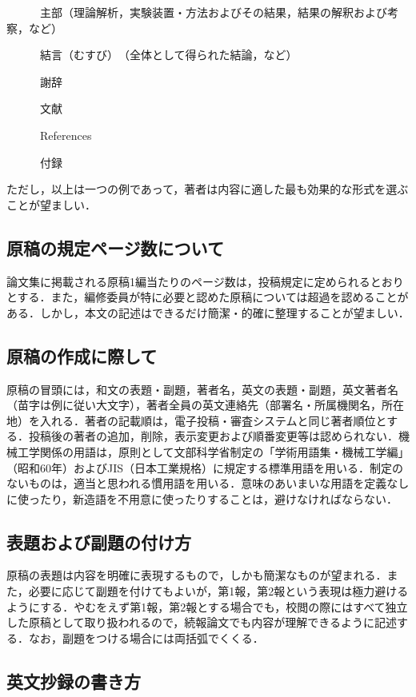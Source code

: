 \documentclass[a4jsme, fleqn]{jsmepaper}
\begin{document}
　　　主部（理論解析，実験装置・方法およびその結果，結果の解釈および考察，など）

　　　結言（むすび）　（全体として得られた結論，など）

　　　謝辞

　　　文献

　　　References

　　　付録

ただし，以上は一つの例であって，著者は内容に適した最も効果的な形式を選ぶことが望ましい．

\subsection{原稿の規定ページ数について}

論文集に掲載される原稿1編当たりのページ数は，投稿規定に定められるとおりとする．また，編修委員が特に必要と認めた原稿については超過を認めることがある．しかし，本文の記述はできるだけ簡潔・的確に整理することが望ましい．

\subsection{原稿の作成に際して}

原稿の冒頭には，和文の表題・副題，著者名，英文の表題・副題，英文著者名（苗字は例に従い大文字），著者全員の英文連絡先（部署名・所属機関名，所在地）を入れる．著者の記載順は，電子投稿・審査システムと同じ著者順位とする．投稿後の著者の追加，削除，表示変更および順番変更等は認められない．機械工学関係の用語は，原則として文部科学省制定の「学術用語集・機械工学編」（昭和60年）およびJIS（日本工業規格）に規定する標準用語を用いる．制定のないものは，適当と思われる慣用語を用いる．意味のあいまいな用語を定義なしに使ったり，新造語を不用意に使ったりすることは，避けなければならない．

\subsection{表題および副題の付け方}

原稿の表題は内容を明確に表現するもので，しかも簡潔なものが望まれる．また，必要に応じて副題を付けてもよいが，第1報，第2報という表現は極力避けるようにする．やむをえず第1報，第2報とする場合でも，校閲の際にはすべて独立した原稿として取り扱われるので，続報論文でも内容が理解できるように記述する．なお，副題をつける場合には両括弧でくくる．

\subsection{英文抄録の書き方}
\end{document}
